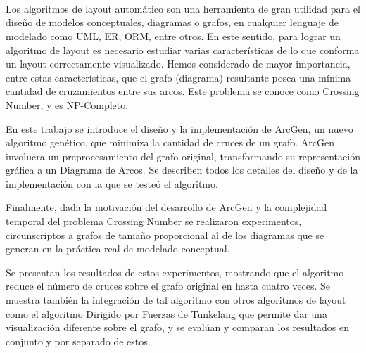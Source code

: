 \ \\
\ \\
\label{pagresum}
\\
\ \\
\ \\

\ \\

\ \\
\ \\
Los algoritmos de layout automático son una herramienta de gran utilidad para el diseño de modelos conceptuales, diagramas o grafos, en cualquier lenguaje de modelado como UML, ER, ORM, entre otros. En este sentido, para lograr un algoritmo de layout es necesario estudiar varias características de lo que conforma un layout correctamente visualizado. Hemos considerado de mayor importancia, entre estas características, que el grafo (diagrama) resultante posea una mínima cantidad de cruzamientos entre sus arcos. Este problema se conoce como Crossing Number, y es NP-Completo. 

En este trabajo se introduce el diseño y la implementación de  {\sc ArcGen}, un nuevo algoritmo genético,  que minimiza la cantidad de cruces de un grafo. {\sc ArcGen} involucra  un preprocesamiento del  grafo  original,  transformando su representación gráfica a un Diagrama de Arcos. Se describen todos los detalles del diseño y de la  implementación con la que se testeó el  algoritmo.  

Finalmente, dada la  motivación del desarrollo de  {\sc ArcGen} y la complejidad temporal del problema Crossing Number se realizaron experimentos, circunscriptos a grafos de tamaño proporcional al de los diagramas que se generan en la práctica real de modelado conceptual. 

Se presentan los resultados de estos experimentos, mostrando que el algoritmo reduce el número de cruces sobre el grafo original en hasta cuatro veces. Se muestra también la integración de tal algoritmo con otros algoritmos de layout como el algoritmo Dirigido por Fuerzas de Tunkelang que permite dar una visualización diferente sobre el grafo, y se evalúan y comparan los resultados en conjunto y por separado de estos.

\vfill
\pagebreak
